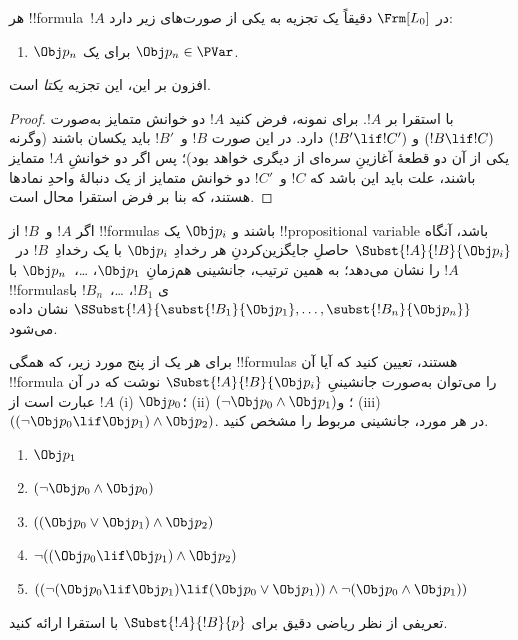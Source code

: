 \documentclass[../../../include/open-logic-section]{subfiles}
\begin{document}
\begin{prop}
هر !!{formula}~$!A$ در $ \Frm[L_0]$ دقیقاً یک تجزیه به یکی از
صورت‌های زیر دارد:
\begin{enumerate}


\item $\Obj p_n$ برای یک $\Obj p_n \in  \PVar$.





\end{enumerate}
افزون بر این، این تجزیه \emph{یکتا} است.
\end{prop}

\begin{proof}
با استقرا بر $!A$. برای نمونه، فرض کنید $!A$ دو خوانش متمایز به‌صورت
$(!B \lif !C)$ و $(!B' \lif !C')$ دارد. در این صورت $!B$ و~$!B'$ باید
یکسان باشند (وگرنه یکی از آن دو قطعهٔ آغازینِ سره‌ای از دیگری خواهد بود)؛ پس اگر دو
خوانشِ $!A$ متمایز باشند، علت باید این باشد که $!C$ و~$!C'$ دو خوانش متمایز
از یک دنبالهٔ واحدِ نمادها هستند، که بنا بر فرض استقرا محال است.
\end{proof}


\begin{defn}
اگر $!A$ و~$!B$ از !!{formula}s باشند و $\Obj p_i$ یک !!{propositional
variable} باشد، آنگاه $\Subst{!A}{!B}{\Obj p_i}$ حاصلِ جایگزین‌کردنِ هر
رخدادِ $\Obj p_i$ با یک رخدادِ~$!B$ در~$!A$ را نشان می‌دهد؛ به همین ترتیب،
جانشینی هم‌زمانِ $\Obj p_1$، \dots،~$\Obj p_n$ با !!{formula}sی
$!B_1$، \dots،~$!B_n$ با
$\SSubst{!A}{\subst{!B_1}{\Obj p_1},\dots,\subst{!B_n}{\Obj p_n}}$ نشان داده می‌شود.
\end{defn}

\begin{prob} برای هر یک از پنج مورد زیر، که همگی !!{formula}s هستند، تعیین
 کنید که آیا آن !!{formula} را می‌توان به‌صورت جانشینیِ \( \Subst{!A}{!B}{\Obj p_i} \)
 نوشت که در آن \( !A \) عبارت است از (i) \( \Obj p_0 \)؛ (ii) \( ( \lnot \Obj p_0 \land \Obj
 p_1) \)؛ و (iii) \( ( ( \lnot \Obj p_0 \lif \Obj p_1 ) \land \Obj
 p_2 ) \). در هر مورد، جانشینی مربوط را مشخص کنید.
  \begin{enumerate}
    \item \( \Obj p_1 \)
    \item \( ( \lnot \Obj p_0 \land \Obj p_0 ) \)
    \item \( ( ( \Obj p_0 \lor \Obj p_1 ) \land \Obj p_2 )  \)
    \item \( \lnot ( ( \Obj p_0 \lif \Obj p_1 ) \land \Obj p_2 ) \)
    \item \( (( \lnot ( \Obj p_0 \lif \Obj p_1 ) \lif ( \Obj p_0 \lor \Obj p_1 )) \land \lnot ( \Obj p_0 \land \Obj p_1 )) \)
  \end{enumerate}
\end{prob}

\begin{prob}
تعریفی از نظر ریاضی دقیق برای $\Subst{!A}{!B}{p}$ با استقرا ارائه کنید.
\end{prob}
\end{document}
